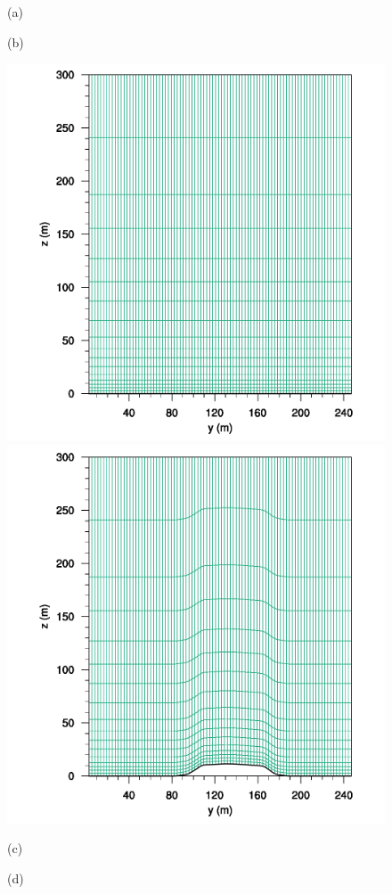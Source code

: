 \begin{figure}[H]
	\centering
	\begin{minipage}{0.5\linewidth}
		\center(a)
	\end{minipage}%
	\begin{minipage}{0.5\linewidth}
		\center(b)
	\end{minipage}%
	
	\includegraphics[width=0.5\linewidth,trim={3cm 0cm 0cm 0cm},clip]{Imagenes/05/bol_mesh_y000001}%
	\includegraphics[width=0.5\linewidth,trim={3cm 0cm 0cm 0cm},clip]{Imagenes/05/bol_mesh_y000022}%
	
	\begin{minipage}{0.5\linewidth}
		\center(c)
	\end{minipage}%
	\begin{minipage}{0.5\linewidth}
		\center(d)
	\end{minipage}%
	

\end{figure}
